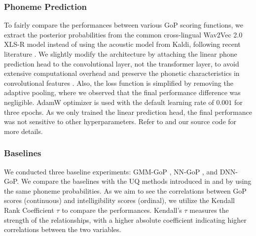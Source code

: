 \subsubsection{Phoneme Prediction} \label{sssec:phone_pred}
To fairly compare the performances between various GoP scoring functions, we extract the posterior probabilities from the common cross-lingual Wav2Vec 2.0 XLS-R model \cite{babu2022xls} instead of using the acoustic model from Kaldi, following recent literature \cite{xu2021explore}.
We slightly modify the architecture by attaching the linear phone prediction head to the convolutional layer, not the transformer layer, to avoid extensive computational overhead and preserve the phonetic characteristics in convolutional features \cite{choi2022opening}.
Also, the loss function is simplified by removing the adaptive pooling, where we observed that the final performance difference was negligible.
AdamW optimizer \cite{loshchilov2019decoupled} is used with the default learning rate of $0.001$ for three epochs.
As we only trained the linear prediction head, the final performance was not sensitive to other hyperparameters.
Refer to \cite{xu2021explore} and our source code for more details.


\subsubsection{Baselines} \label{sssec:baselines}
We conducted three baseline experiments: GMM-GoP \cite{witt2000phone}, NN-GoP \cite{hu2015improved}, and DNN-GoP.
We compare the baselines with the UQ methods introduced in  and  by using the same phoneme probabilities.
As we aim to see the correlations between GoP scores (continuous) and intelligibility scores (ordinal),
we utilize the Kendall Rank Coefficient $\tau$ to compare the performances.
Kendall's $\tau$ measures the strength of the relationships, with a higher absolute coefficient indicating higher correlations between the two variables.

